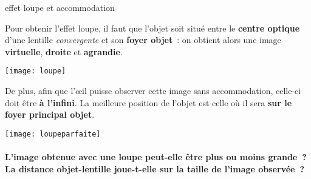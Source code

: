 \documentclass[../main/main.tex]{subfiles}
\begin{document}
\begin{defi}[label=def:loupe, valign=center]{effet loupe et accommodation}
    \begin{tcolorbox}[sidebyside, sidebyside align=center,
    enhanced, colback=green!10!, colframe=green!60!black, valign=center,
    arc=0pt, boxsep=1mm, notitle, oversize, nobeforeafter, frame hidden,
    righthand width=.5\linewidth]
        Pour obtenir l'effet loupe, il faut que l'objet soit situé entre le
        \textbf{centre optique} d'une lentille \textit{convergente} et son
        \textbf{foyer objet}~: on obtient alors une image \textbf{virtuelle},
        \textbf{droite} et \textbf{agrandie}.
        \vfill
        \tcblower
        \begin{center}
            \texttt{[image: loupe]}
            \label{loupeavecacc}
        \end{center}
    \end{tcolorbox}
    \tcblower
    \begin{tcolorbox}[sidebyside, sidebyside align=center,
    enhanced, colback=green!10!, colframe=green!60!black, valign=center,
    arc=0pt, boxsep=1mm, notitle, oversize, nobeforeafter, frame hidden,
    righthand width=.5\linewidth]
        
        De plus, afin que l'œil puisse observer cette image sans accommodation,
        celle-ci doit être \textbf{à l'infini}. La meilleure position de l'objet
        est celle où il sera \textbf{sur le foyer principal objet}.

        \tcblower
        \begin{center}
            \texttt{[image: loupeparfaite]}
            \label{loupesansacc}
        \end{center}

    \end{tcolorbox}
\end{defi}

\paragraph*{L'image obtenue avec une loupe peut-elle être plus ou moins grande~?
La distance objet-lentille joue-t-elle sur la taille de l'image
observée~?\newline\newline}
\end{document}
